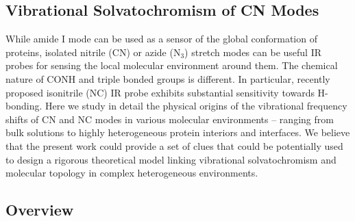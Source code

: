 \documentclass[a4paper,titlepage,twoside,fleqn,12pt]{book}
\begin{document}

\begin{refsection}

\chapter{Vibrational Solvatochromism of CN Modes\label{c:cn-modes}}

While amide I mode can be used as a sensor of the global conformation
of proteins, isolated nitrile (CN) or azide (N$_3$) 
stretch modes can be useful IR probes for sensing the local molecular environment
around them. The chemical nature of CONH and triple bonded groups
is different. In particular, recently proposed isonitrile (NC) 
IR probe exhibits substantial sensitivity towards H-bonding.
Here we study in detail the physical origins
of the vibrational frequency shifts of CN and NC modes
in various molecular environments -- ranging from bulk solutions
to highly heterogeneous protein interiors and interfaces.
We believe that the present work could provide a set of clues 
that could be potentially used to design a rigorous
theoretical model linking vibrational solvatochromism 
and molecular topology in complex heterogeneous environments.

\section{Overview}


\end{refsection}
\end{document}
